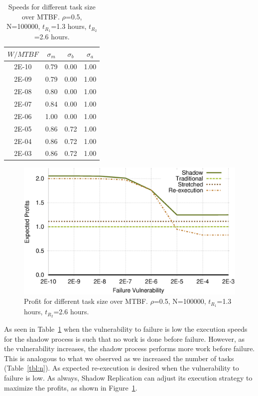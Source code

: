 \begin{table}[!h]\small
	\caption{Speeds for different task size over MTBF. $\rho$=0.5, N=100000, $t_{R_1}$=1.3 hours, $t_{R_2}$=2.6 hours.}
	\centering
		\begin{tabular}{|c|c|c|c|}
		\hline
		$W/MTBF$ & $\sigma_m$ & $\sigma_b$ & $\sigma_a$ \\
		\hline
		2E-10	&	0.79 &	0.00 &	1.00 \\
		\hline
		2E-09	&	0.79 &	0.00 &	1.00 \\
		\hline
		2E-08	&	0.80 &	0.00 &	1.00 \\
		\hline
		2E-07	&	0.84 &	0.00 &	1.00 \\
		\hline
		2E-06	&	1.00 &	0.00 &	1.00 \\
		\hline
		2E-05	&	0.86 &	0.72 &	1.00 \\
		\hline
		2E-04	&	0.86 &	0.72 &	1.00 \\
		\hline
		2E-03	&	0.86 &	0.72 &	1.00 \\
		\hline
		\end{tabular}
	\label{tbl:mtbf}
\end{table}

\begin{figure}[!h]	
	\begin{center}
			\includegraphics[width=\columnwidth]{diagrams/mtbf_profit.eps}
	\end{center}
	\caption{Profit for different task size over MTBF. $\rho$=0.5, N=100000, $t_{R_1}$=1.3 hours, $t_{R_2}$=2.6 hours.}
	\label{fig:mtbf}
\end{figure}

As seen in Table~\ref{tbl:mtbf} when the vulnerability to
failure is low the execution speeds for the shadow process is such
that no work is done before failure. However, as the
vulnerability increases, the shadow process performs more work before
failure. This is analogous to what we observed as we increased the
number of tasks (Table~\ref{tbl:n}). As expected
re-execution is desired when the vulnerability to failure is
low. As always, Shadow Replication can adjust its execution strategy to maximize the profits, as shown in Figure~\ref{fig:mtbf}.

